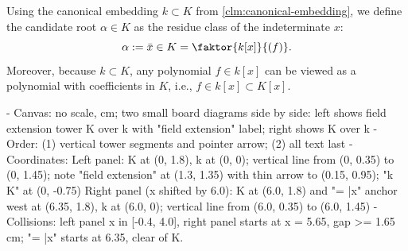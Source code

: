 \begin{content}[Field Extensions and the Element \texorpdfstring{$\alpha = \bar{x} \in K$}{alpha = x-bar in K}]

Using the canonical embedding $k \subset K$ from \cref{clm:canonical-embedding}, we define the candidate root $\alpha \in K$ as the residue class of the indeterminate $x$:
\[
\alpha := \bar{x} \in K = \faktor{k[x]}{(f)}.
\]
Moreover, because $k \subset K$, any polynomial $f \in k[x]$ can be viewed as a polynomial with coefficients in $K$, i.e., $f \in k[x] \subset K[x]$.

\begin{hidden}
- Canvas: no scale, cm; two small board diagrams side by side: left shows field extension tower K over k with "field extension" label; right shows K \ni \alpha over k
- Order: (1) vertical tower segments and pointer arrow; (2) all text last
- Coordinates:
  Left panel: K at (0, 1.8), k at (0, 0); vertical line from (0, 0.35) to (0, 1.45); note "field extension" at (1.3, 1.35) with thin arrow to (0.15, 0.95); "k \subset K" at (0, -0.75)
  Right panel (x shifted by 6.0): K at (6.0, 1.8) and "\ni \alpha = \bar{x}" anchor west at (6.35, 1.8), k at (6.0, 0); vertical line from (6.0, 0.35) to (6.0, 1.45)
- Collisions: left panel x in [-0.4, 4.0], right panel starts at x = 5.65, gap >= 1.65 cm; "\ni \alpha = \bar{x}" starts at 6.35, clear of K.
\end{hidden}
\begin{center}
\end{center}
\end{content}

